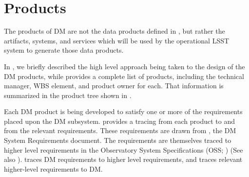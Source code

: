 \section{Products \label{sect:products}}

The products of DM are not the data products defined in ,
but rather the artifacts, systems, and services which will be used by the
operational LSST system to generate those data products.

In , we briefly described the high level approach being taken to the design of the DM products, while  provides a complete list of products, including the technical manager, WBS element, and product owner for each.
That information is summarized in the product tree shown in .

Each DM product is being developed to satisfy one or more of the requirements placed upon the DM subsystem.  provides a tracing from each product to and from the relevant requirements.
These requirements are drawn from , the DM System Requirements document.
The requirements  are themselves traced to higher level requirements in
the Observatory System Specifications (OSS; ) (See also ).
 traces DM requirements to higher level requirements, and  traces relevant higher-level requirements to DM.

